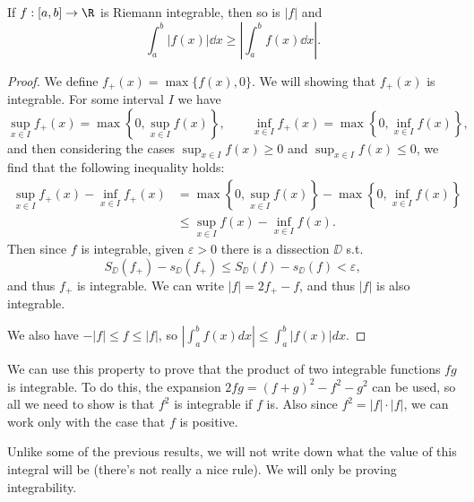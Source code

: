 \begin{proposition}
	If $f :[a, b] \rightarrow \R$ is Riemann integrable, then so is $|f|$ and
	$$
	\int_a^b |f(x) | \dd x \geq \left|\int_a^b f(x) \dd x\right|.
	$$
\end{proposition}
\begin{proof}
	We define $f_+(x) = \max\{f(x), 0\}$. We will showing that $f_+(x)$ is integrable. For some interval $I$ we have
	$$
	\sup_{x \in I} f_+(x) = \max\left\{0, \sup_{x \in I} f(x)\right\}, \quad \quad \inf_{x \in I} f_+(x) = \max\left\{0, \inf_{x \in I} f(x)\right\},
	$$
	and then considering the cases $\sup_{x \in I}f(x) \geq 0$ and $\sup_{x \in I}f(x) \leq 0$, we find that the following inequality holds:
	\begin{align*}
	\sup_{x \in I} f_+(x) - \inf_{x \in I} f_+(x) &= \max\left\{0, \sup_{x \in I} f(x)\right\} - \max\left\{0, \inf_{x \in I} f(x)\right\}  \\
	& \leq \sup_{x \in I} f(x) - \inf_{x \in I} f(x).
\end{align*}
Then since $f$ is integrable, given $\varepsilon > 0$ there is a dissection $\DD$ s.t.
$$
S_{\DD}(f_+) - s_{\DD}(f_+) \leq S_{\DD}(f) - s_{\DD}(f) < \varepsilon,
$$
and thus $f_+$ is integrable. We can write $|f| = 2f_+ - f$, and thus $|f|$ is also integrable.

We also have $-|f| \leq f \leq |f|$, so $\left|\int_{a}^{b} f(x) d x\right| \leq \int_{a}^{b}|f(x)| d x$.
\end{proof}

We can use this property to prove that the product of two integrable functions $fg$ is integrable. To do this, the expansion $2fg = (f + g)^2 - f^2 - g^2$ can be used, so all we need to show is that $f^2$ is integrable if $f$ is. Also since $f^2 = |f| \cdot |f|$, we can work only with the case that $f$ is positive.

Unlike some of the previous results, we will not write down what the value of this integral will be (there's not really a nice rule). We will only be proving integrability.

